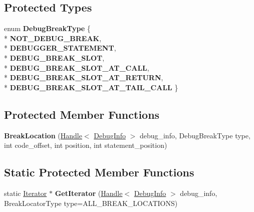 \subsection*{Protected Types}
\begin{DoxyCompactItemize}
\item 
enum {\bfseries Debug\+Break\+Type} \{ \\*
{\bfseries N\+O\+T\+\_\+\+D\+E\+B\+U\+G\+\_\+\+B\+R\+E\+AK}, 
\\*
{\bfseries D\+E\+B\+U\+G\+G\+E\+R\+\_\+\+S\+T\+A\+T\+E\+M\+E\+NT}, 
\\*
{\bfseries D\+E\+B\+U\+G\+\_\+\+B\+R\+E\+A\+K\+\_\+\+S\+L\+OT}, 
\\*
{\bfseries D\+E\+B\+U\+G\+\_\+\+B\+R\+E\+A\+K\+\_\+\+S\+L\+O\+T\+\_\+\+A\+T\+\_\+\+C\+A\+LL}, 
\\*
{\bfseries D\+E\+B\+U\+G\+\_\+\+B\+R\+E\+A\+K\+\_\+\+S\+L\+O\+T\+\_\+\+A\+T\+\_\+\+R\+E\+T\+U\+RN}, 
\\*
{\bfseries D\+E\+B\+U\+G\+\_\+\+B\+R\+E\+A\+K\+\_\+\+S\+L\+O\+T\+\_\+\+A\+T\+\_\+\+T\+A\+I\+L\+\_\+\+C\+A\+LL}
 \}\hypertarget{classv8_1_1internal_1_1_break_location_abe7e36f8f268b8d17653f06442123e1a}{}\label{classv8_1_1internal_1_1_break_location_abe7e36f8f268b8d17653f06442123e1a}

\end{DoxyCompactItemize}
\subsection*{Protected Member Functions}
\begin{DoxyCompactItemize}
\item 
{\bfseries Break\+Location} (\hyperlink{classv8_1_1internal_1_1_handle}{Handle}$<$ \hyperlink{classv8_1_1internal_1_1_debug_info}{Debug\+Info} $>$ debug\+\_\+info, Debug\+Break\+Type type, int code\+\_\+offset, int position, int statement\+\_\+position)\hypertarget{classv8_1_1internal_1_1_break_location_ac52a8642899a8574611127cbd0482698}{}\label{classv8_1_1internal_1_1_break_location_ac52a8642899a8574611127cbd0482698}

\end{DoxyCompactItemize}
\subsection*{Static Protected Member Functions}
\begin{DoxyCompactItemize}
\item 
static \hyperlink{classv8_1_1internal_1_1_break_location_1_1_iterator}{Iterator} $\ast$ {\bfseries Get\+Iterator} (\hyperlink{classv8_1_1internal_1_1_handle}{Handle}$<$ \hyperlink{classv8_1_1internal_1_1_debug_info}{Debug\+Info} $>$ debug\+\_\+info, Break\+Locator\+Type type=A\+L\+L\+\_\+\+B\+R\+E\+A\+K\+\_\+\+L\+O\+C\+A\+T\+I\+O\+NS)\hypertarget{classv8_1_1internal_1_1_break_location_a98ee444d05ea801a0d195f78e07a6a1c}{}\label{classv8_1_1internal_1_1_break_location_a98ee444d05ea801a0d195f78e07a6a1c}

\end{DoxyCompactItemize}
